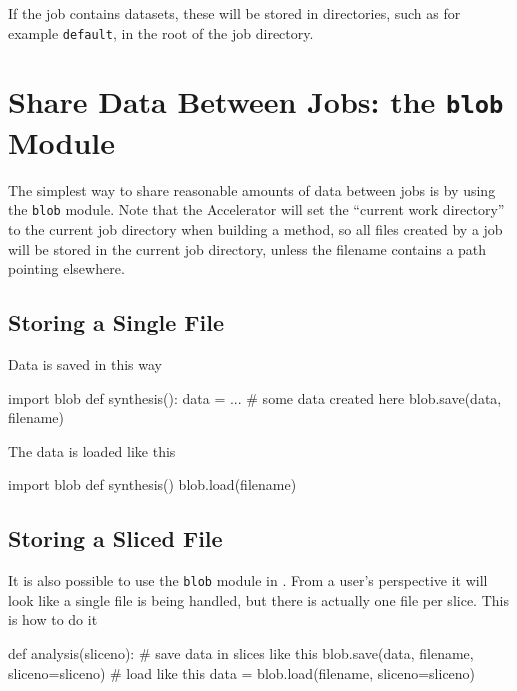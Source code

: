 If the job contains datasets, these will be stored in directories,
such as for example \texttt{default}, in the root of the job
directory.





\section{Share Data Between Jobs:  the \texttt{blob} Module}

The simplest way to share reasonable amounts of data between jobs is
by using the \texttt{blob} module.  Note that the Accelerator will set
the ``current work directory'' to the current job directory when
building a method, so all files created by a job will be stored in the
current job directory, unless the filename contains a path pointing
elsewhere.

\subsection*{Storing a  Single File}
Data is saved in this way
\begin{python}
import blob
def synthesis():
    data = ...  # some data created here
    blob.save(data, filename)
\end{python}
The data is loaded like this
\begin{python}
import blob
def synthesis()
    blob.load(filename)
\end{python}

\subsection*{Storing a Sliced File}
It is also possible to use the \texttt{blob} module in \analysis.
From a user's perspective it will look like a single file is being
handled, but there is actually one file per slice.  This is how to do
it
\begin{python}
def analysis(sliceno):
    # save data in slices like this
    blob.save(data, filename, sliceno=sliceno)
    # load like this
    data = blob.load(filename, sliceno=sliceno)
\end{python}

